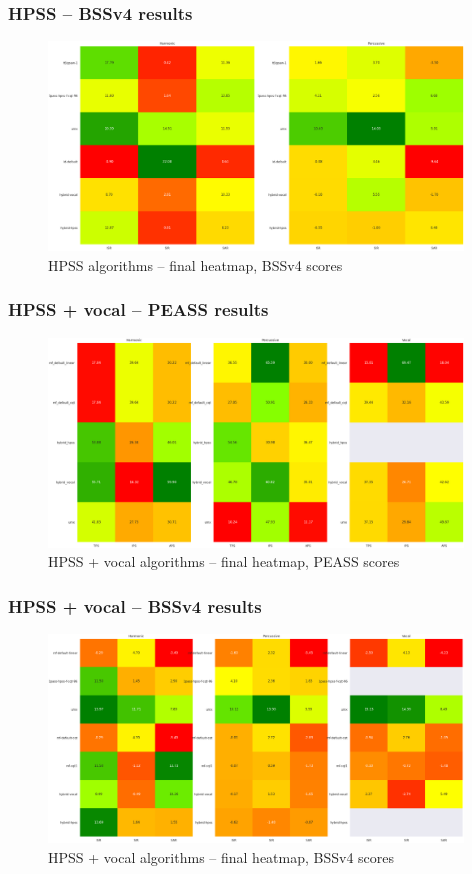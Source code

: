\documentclass{beamer}
\begin{document}
\begin{frame}
	\frametitle{HPSS -- BSSv4 results}
	\begin{figure}[ht]
		\includegraphics[width=11cm]{../evaluation/heatmaps/Final_HPSS_BSSv4_abbrev.png}
		\caption{HPSS algorithms -- final heatmap, BSSv4 scores}
	\end{figure}
\end{frame}

\begin{frame}
	\frametitle{HPSS + vocal -- PEASS results}
	\begin{figure}[ht]
		\includegraphics[width=11cm]{../evaluation/heatmaps/Final_Vocal_PEASS_abbrev.png}
		\caption{HPSS + vocal algorithms -- final heatmap, PEASS scores}
	\end{figure}
\end{frame}

\begin{frame}
	\frametitle{HPSS + vocal -- BSSv4 results}
	\begin{figure}[ht]
		\includegraphics[width=11cm]{../evaluation/heatmaps/Final_Vocal_BSSv4_abbrev.png}
		\caption{HPSS + vocal algorithms -- final heatmap, BSSv4 scores}
	\end{figure}
\end{frame}
\end{document}
